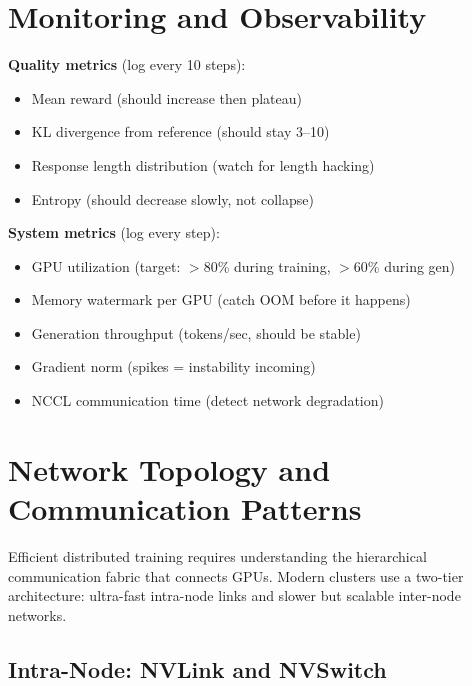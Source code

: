 \section{Monitoring and Observability}
\label{monitoring-and-observability}

\begin{keybox}
\textbf{Quality metrics} (log every 10 steps):

\begin{itemize}
  \item Mean reward (should increase then plateau)
  \item KL divergence from reference (should stay 3--10)
  \item Response length distribution (watch for length hacking)
  \item Entropy (should decrease slowly, not collapse)
\end{itemize}

\textbf{System metrics} (log every step):

\begin{itemize}
  \item GPU utilization (target: $>$80\% during training, $>$60\% during gen)
  \item Memory watermark per GPU (catch OOM before it happens)
  \item Generation throughput (tokens/sec, should be stable)
  \item Gradient norm (spikes = instability incoming)
  \item NCCL communication time (detect network degradation)
\end{itemize}
\end{keybox}

\section{Network Topology and Communication Patterns}
\label{sec:network-topology}

Efficient distributed training requires understanding the hierarchical communication fabric that connects GPUs. Modern clusters use a two-tier architecture: ultra-fast intra-node links and slower but scalable inter-node networks.

\subsection{Intra-Node: NVLink and NVSwitch}
\label{intra-node-nvlink-and-nvswitch}

